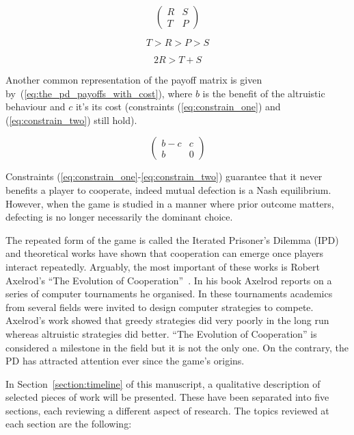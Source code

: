 \documentclass{article}
\theoremstyle{definition}
\begin{document}
\begin{equation} \label{eq:the_pd_payoffs}
    \begin{pmatrix}
    R & S \\ T & P
    \end{pmatrix}
\end{equation}

\begin{equation}\label{eq:constrain_one}
    T > R > P > S
\end{equation}

\begin{equation}\label{eq:constrain_two}
    2R > T + S
\end{equation}

Another common representation of the payoff matrix is given by~(\ref{eq:the_pd_payoffs_with_cost}),
where \(b\) is the benefit of the altruistic behaviour and \(c\) it's its cost
(constraints (\ref{eq:constrain_one}) and (\ref{eq:constrain_two}) still hold).

\begin{equation}\label{eq:the_pd_payoffs_with_cost}
    \begin{pmatrix}
        b - c & c \\ b & 0
    \end{pmatrix}
\end{equation}

Constraints (\ref{eq:constrain_one}-\ref{eq:constrain_two})
guarantee that it never benefits a player to cooperate, indeed mutual
defection is a Nash equilibrium. However, when the game is studied in a manner
where prior outcome matters, defecting is no longer necessarily the dominant
choice.

The repeated form of the game is called the Iterated Prisoner's Dilemma (IPD)
and theoretical works have shown that cooperation can emerge once players
interact repeatedly. Arguably, the most important of these works is Robert
Axelrod's ``The Evolution of Cooperation''~\cite{Axelrod1984}. In his book
Axelrod reports on a series of computer tournaments he organised. In these
tournaments academics from several fields were invited to design computer
strategies to compete. Axelrod's work showed that greedy
strategies did very poorly in the long run whereas altruistic strategies did
better. ``The Evolution of Cooperation'' is considered a milestone in the field
but it is not the only one. On the contrary, the PD has attracted attention ever
since the game's origins.

In Section~\ref{section:timeline} of this manuscript, a qualitative description of selected pieces
of work will be presented. These have been separated into five sections, each
reviewing a different aspect of research. The topics reviewed at each section
are the following:
\end{document}
